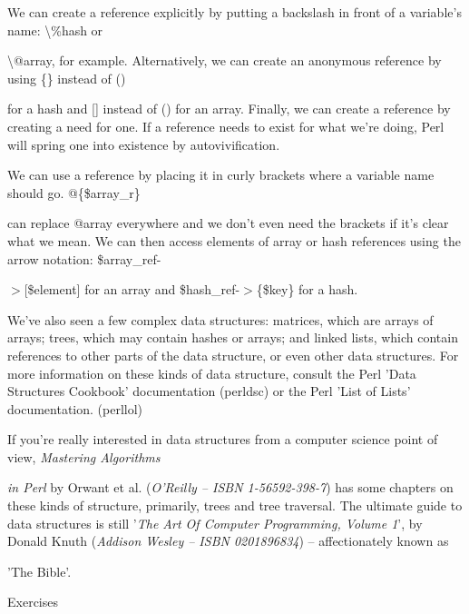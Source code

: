 \documentclass[a4paper,11pt]{book}
\begin{document}
\noindent 

\noindent We can create a reference explicitly by putting a backslash in front of a variable's name: \textbackslash \%hash or

\noindent \textbackslash @array, for example. Alternatively, we can create an anonymous reference by using \{\} instead of ()

\noindent for a hash and [] instead of () for an array. Finally, we can create a reference by creating a need for one. If a reference needs to exist for what we're doing, Perl will spring one into existence by autovivification.

\noindent 

\noindent We can use a reference by placing it in curly brackets where a variable name should go. @\{\$array\_r\}

\noindent can replace @array everywhere and we don't even need the brackets if it's clear what we mean. We can then access elements of array or hash references using the arrow notation: \$array\_ref-

\noindent $>$[\$element] for an array and \$hash\_ref-$>$\{\$key\} for a hash.

\noindent 

\noindent We've  also  seen a few  complex  data  structures:  matrices,  which  are arrays  of  arrays;  trees,  which may  contain hashes or arrays;  and  linked  lists,  which  contain  references  to  other  parts  of  the  data structure,  or even other data structures.  For  more  information  on  these  kinds  of  data structure, consult the Perl 'Data Structures  Cookbook'  documentation  (perldsc)  or  the Perl  'List of  Lists' documentation.  (perllol)

\noindent 

\noindent If you're really interested in data structures from a computer science point of view, \textit{Mastering Algorithms}

\noindent \textit{in Perl }by Orwant et al. (\textit{O'Reilly -- ISBN 1-56592-398-7}) has some chapters on these kinds of structure, primarily, trees and tree traversal. The ultimate guide to data structures is still '\textit{The Art Of Computer Programming, Volume 1}', by Donald Knuth (\textit{Addison Wesley -- ISBN 0201896834}) -- affectionately known as

\noindent 'The Bible'.

\noindent 

\noindent 

\noindent Exercises
\end{document}
